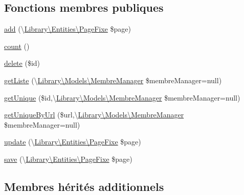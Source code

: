 \subsection*{Fonctions membres publiques}
\begin{DoxyCompactItemize}
\item 
\hyperlink{class_library_1_1_models_1_1_page_fixe_manager_aefbb84f33b85315f616c2616bef7f624}{add} (\textbackslash{}\hyperlink{class_library_1_1_entities_1_1_page_fixe}{Library\textbackslash{}\+Entities\textbackslash{}\+Page\+Fixe} \$page)
\item 
\hyperlink{class_library_1_1_models_1_1_page_fixe_manager_ac751e87b3d4c4bf2feb03bee8b092755}{count} ()
\item 
\hyperlink{class_library_1_1_models_1_1_page_fixe_manager_a2f8258add505482d7f00ea26493a5723}{delete} (\$id)
\item 
\hyperlink{class_library_1_1_models_1_1_page_fixe_manager_ab569f8e7e64b40e73bb4602d0100949a}{get\+Liste} (\textbackslash{}\hyperlink{class_library_1_1_models_1_1_membre_manager}{Library\textbackslash{}\+Models\textbackslash{}\+Membre\+Manager} \$membre\+Manager=null)
\item 
\hyperlink{class_library_1_1_models_1_1_page_fixe_manager_a6813dfac681bc517ce0a9608f48367f3}{get\+Unique} (\$id,\textbackslash{}\hyperlink{class_library_1_1_models_1_1_membre_manager}{Library\textbackslash{}\+Models\textbackslash{}\+Membre\+Manager} \$membre\+Manager=null)
\item 
\hyperlink{class_library_1_1_models_1_1_page_fixe_manager_af0e5053789c8ab10d26dff9390e9e3b1}{get\+Unique\+By\+Url} (\$url,\textbackslash{}\hyperlink{class_library_1_1_models_1_1_membre_manager}{Library\textbackslash{}\+Models\textbackslash{}\+Membre\+Manager} \$membre\+Manager=null)
\item 
\hyperlink{class_library_1_1_models_1_1_page_fixe_manager_a4b373084f63726addf406af3a14b3155}{update} (\textbackslash{}\hyperlink{class_library_1_1_entities_1_1_page_fixe}{Library\textbackslash{}\+Entities\textbackslash{}\+Page\+Fixe} \$page)
\item 
\hyperlink{class_library_1_1_models_1_1_page_fixe_manager_aaa4d1eaf5a09f9c9d18b1f36258417a9}{save} (\textbackslash{}\hyperlink{class_library_1_1_entities_1_1_page_fixe}{Library\textbackslash{}\+Entities\textbackslash{}\+Page\+Fixe} \$page)
\end{DoxyCompactItemize}
\subsection*{Membres hérités additionnels}


